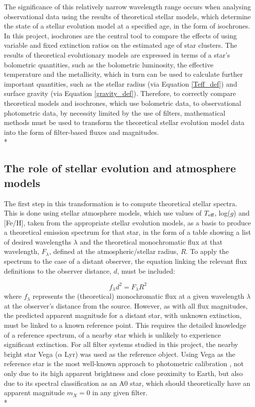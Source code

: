\documentclass[12pt, a4paper]{report}
\begin{document}
The significance of this relatively narrow wavelength range occurs when analysing observational data using the results of theoretical stellar models, which determine the state of a stellar evolution model at a specified age, in the form of isochrones. In this project, isochrones are the central tool to compare the effects of using variable and fixed extinction ratios on the estimated age of star clusters. The results of theoretical evolutionary models are expressed in terms of a star's bolometric quantities, such as the bolometric luminosity, the effective temperature and the metallicity, which in turn can be used to calculate further important quantities, such as the stellar radius (via Equation \ref{Teff_def}) and surface gravity (via Equation \ref{gravity_def}). Therefore, to correctly compare theoretical models and isochrones, which use bolometric data, to observational photometric data, by necessity limited by the use of filters, mathematical methods must be used to transform the theoretical stellar evolution model data into the form of filter-based fluxes and magnitudes.\\*

\subsection{The role of stellar evolution and atmosphere models}
The first step in this transformation is to compute theoretical stellar spectra. This is done using stellar atmosphere models, which use values of $T_{\textnormal{eff}}$, log($g$) and [Fe/H], taken from the appropriate stellar evolution models, as a basis to produce a theoretical emission spectrum for that star, in the form of a table showing a list of desired wavelengths $\lambda$ and the theoretical monochromatic flux at that wavelength, $F_{\lambda}$, defined at the atmospheric/stellar radius, $R$. To apply the spectrum to the case of a distant observer, the equation linking the relevant flux definitions to the observer distance, $d$, must be included:

\begin{equation}
f_{\lambda}d^{2}=F_{\lambda}R^{2}
\label{flux_dist_rd}
\end{equation}
where $f_{\lambda}$ represents the (theoretical) monochromatic flux at a given wavelength $\lambda$ at the observer's distance from the source. However, as with all flux magnitudes, the predicted apparent magnitude for a distant star, with unknown extinction, must be linked to a known reference point. This requires the detailed knowledge of a reference spectrum, of a nearby star which is unlikely to experience significant extinction. For all filter systems studied in this project, the nearby bright star Vega ($\alpha$ Lyr) was used as the reference object. Using Vega as the reference star is the most well-known approach to photometric calibration \citep{2014MNRAS.444..392C}, not only due to its high apparent brightness and close proximity to Earth, but also due to its spectral classification as an A0 star, which should theoretically have an apparent magnitude $m_{X} = 0$ in any given filter.\\*
\end{document}
